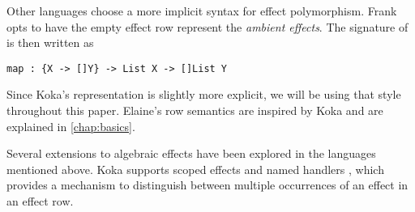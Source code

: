 Other languages choose a more implicit syntax for effect polymorphism. Frank \autocite{lindley_be_2017} opts to have the empty effect row represent the \emph{ambient effects}. The signature of  is then written as
\begin{lstlisting}[language={},style=fancy]
map : {X -> []Y} -> List X -> []List Y
\end{lstlisting}
Since Koka's representation is slightly more explicit, we will be using that style throughout this paper. Elaine's row semantics are inspired by Koka and are explained in \cref{chap:basics}.

Several extensions to algebraic effects have been explored in the languages mentioned above. Koka supports scoped effects and named handlers \autocite{xie_first-class_2022}, which provides a mechanism to distinguish between multiple occurrences of an effect in an effect row.

